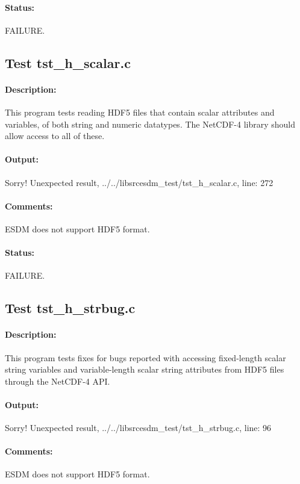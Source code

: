 \paragraph{Status:} FAILURE.

\subsection{Test tst\_h\_scalar.c}

\paragraph{Description:} This program tests reading HDF5 files that contain scalar attributes and variables, of both string and numeric datatypes.
The NetCDF-4 library should allow access to all of these.

\paragraph{Output:} Sorry! Unexpected result, ../../libsrcesdm\_test/tst\_h\_scalar.c, line: 272

\paragraph{Comments:} ESDM does not support HDF5 format.

\paragraph{Status:} FAILURE.

\subsection{Test tst\_h\_strbug.c}

\paragraph{Description:} This program tests fixes for bugs reported with accessing fixed-length scalar string variables and variable-length scalar string attributes from HDF5 files through the NetCDF-4 API.

\paragraph{Output:} Sorry! Unexpected result, ../../libsrcesdm\_test/tst\_h\_strbug.c, line: 96

\paragraph{Comments:} ESDM does not support HDF5 format.

